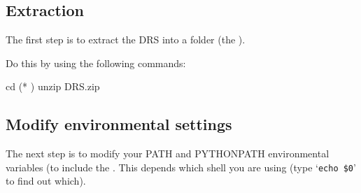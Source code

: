 \subsection{Extraction}
\label{ch:install:installunix:extraction}

The first step is to extract the DRS into a folder (the \InstallDIR).

\noindent Do this by using the following commands:
\begin{cmdbox}
cd (* \InstallDIR *)
unzip DRS.zip
\end{cmdbox}

\subsection{Modify environmental settings}
\label{ch:install:installunix:environ_settings}

The next step is to modify your PATH and PYTHONPATH environmental variables (to include the \InstallDIR. This depends which shell you are using (type `\lstinline[style=bashstyle]{echo $0}' to find out which).

